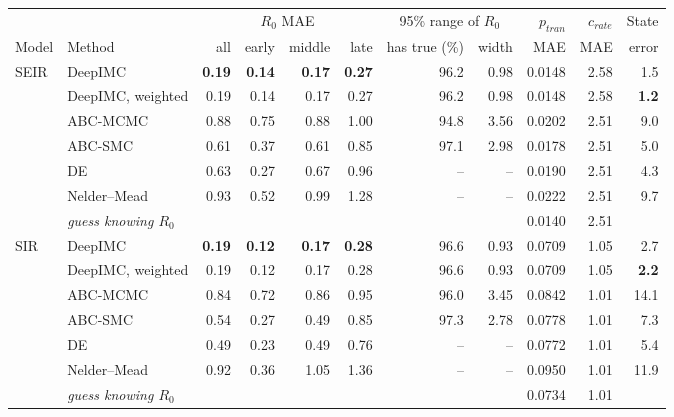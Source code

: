\begin{tabular}{llrrrrrrrrr}
\toprule
 &  & \multicolumn{4}{c}{$R_0$ MAE} & \multicolumn{2}{c}{95\% range of $R_0$} & $p_{tran}$ & $c_{rate}$ & State \\
\cmidrule(lr){3-6}\cmidrule(lr){7-8}
Model & Method & all & early & middle & late & has true (\%) & width & MAE & MAE & error \\
\midrule
SEIR & DeepIMC & \textbf{0.19} & \textbf{0.14} & \textbf{0.17} & \textbf{0.27} & 96.2 & 0.98 & 0.0148 & 2.58 & 1.5 \\
 & DeepIMC, weighted & 0.19 & 0.14 & 0.17 & 0.27 & 96.2 & 0.98 & 0.0148 & 2.58 & \textbf{1.2} \\
 & ABC-MCMC & 0.88 & 0.75 & 0.88 & 1.00 & 94.8 & 3.56 & 0.0202 & 2.51 & 9.0 \\
 & ABC-SMC & 0.61 & 0.37 & 0.61 & 0.85 & 97.1 & 2.98 & 0.0178 & 2.51 & 5.0 \\
 & DE & 0.63 & 0.27 & 0.67 & 0.96 & -- & -- & 0.0190 & 2.51 & 4.3 \\
 & Nelder--Mead & 0.93 & 0.52 & 0.99 & 1.28 & -- & -- & 0.0222 & 2.51 & 9.7 \\
 & \textit{guess knowing $R_0$} &  &  &  &  &  &  & 0.0140 & 2.51 &  \\
\midrule
SIR & DeepIMC & \textbf{0.19} & \textbf{0.12} & \textbf{0.17} & \textbf{0.28} & 96.6 & 0.93 & 0.0709 & 1.05 & 2.7 \\
 & DeepIMC, weighted & 0.19 & 0.12 & 0.17 & 0.28 & 96.6 & 0.93 & 0.0709 & 1.05 & \textbf{2.2} \\
 & ABC-MCMC & 0.84 & 0.72 & 0.86 & 0.95 & 96.0 & 3.45 & 0.0842 & 1.01 & 14.1 \\
 & ABC-SMC & 0.54 & 0.27 & 0.49 & 0.85 & 97.3 & 2.78 & 0.0778 & 1.01 & 7.3 \\
 & DE & 0.49 & 0.23 & 0.49 & 0.76 & -- & -- & 0.0772 & 1.01 & 5.4 \\
 & Nelder--Mead & 0.92 & 0.36 & 1.05 & 1.36 & -- & -- & 0.0950 & 1.01 & 11.9 \\
 & \textit{guess knowing $R_0$} &  &  &  &  &  &  & 0.0734 & 1.01 &  \\
\bottomrule
\end{tabular}
